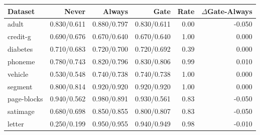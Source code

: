 \begin{tabular}{lrrrrr}
\toprule
Dataset & Never & Always & Gate & Rate & $\Delta$Gate-Always \\
\midrule
adult & 0.830/0.611 & 0.880/0.797 & 0.830/0.611 & 0.00 & -0.050 \\
credit-g & 0.690/0.676 & 0.670/0.640 & 0.670/0.640 & 1.00 & 0.000 \\
diabetes & 0.710/0.683 & 0.720/0.700 & 0.720/0.692 & 0.39 & 0.000 \\
phoneme & 0.780/0.743 & 0.820/0.796 & 0.830/0.806 & 0.99 & 0.010 \\
vehicle & 0.530/0.548 & 0.740/0.738 & 0.740/0.738 & 1.00 & 0.000 \\
segment & 0.800/0.814 & 0.920/0.920 & 0.920/0.920 & 1.00 & 0.000 \\
page-blocks & 0.940/0.562 & 0.980/0.891 & 0.930/0.561 & 0.83 & -0.050 \\
satimage & 0.680/0.698 & 0.850/0.855 & 0.800/0.807 & 0.83 & -0.050 \\
letter & 0.250/0.199 & 0.950/0.955 & 0.940/0.949 & 0.98 & -0.010 \\
\bottomrule
\end{tabular}
